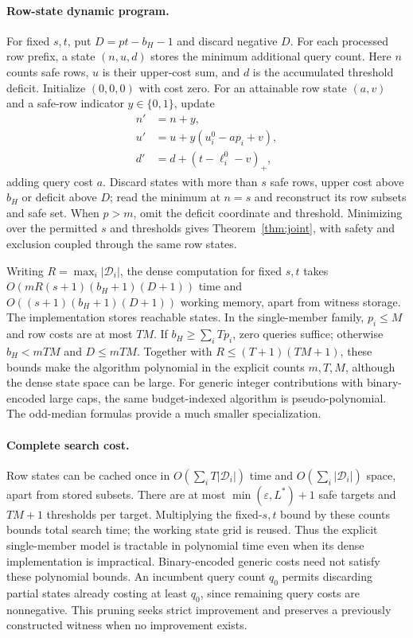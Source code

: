 \paragraph{Row-state dynamic program.}
For fixed $s,t$, put $D=pt-b_H-1$ and discard negative $D$. For each processed row prefix, a state $(n,u,d)$ stores the minimum additional query count. Here $n$ counts safe rows, $u$ is their upper-cost sum, and $d$ is the accumulated threshold deficit. Initialize $(0,0,0)$ with cost zero. For an attainable row state $(a,v)$ and a safe-row indicator $y\in\{0,1\}$, update
\[
 \begin{aligned}
 n'&=n+y,\\
 u'&=u+y(u_i^0-ap_i+v),\\
 d'&=d+(t-\ell_i^0-v)_+,
 \end{aligned}
\]
adding query cost $a$. Discard states with more than $s$ safe rows, upper cost above $b_H$ or deficit above $D$; read the minimum at $n=s$ and reconstruct its row subsets and safe set. When $p>m$, omit the deficit coordinate and threshold. Minimizing over the permitted $s$ and thresholds gives Theorem~\ref{thm:joint}, with safety and exclusion coupled through the same row states.

Writing $R=\max_i|\mathcal D_i|$, the dense computation for fixed $s,t$ takes $O(mR(s+1)(b_H+1)(D+1))$ time and $O((s+1)(b_H+1)(D+1))$ working memory, apart from witness storage. The implementation stores reachable states. In the single-member family, $p_i\le M$ and row costs are at most $TM$. If $b_H\ge\sum_iTp_i$, zero queries suffice; otherwise $b_H<mTM$ and $D\le mTM$. Together with $R\le(T+1)(TM+1)$, these bounds make the algorithm polynomial in the explicit counts $m,T,M$, although the dense state space can be large. For generic integer contributions with binary-encoded large caps, the same budget-indexed algorithm is pseudo-polynomial. The odd-median formulas provide a much smaller specialization.


\paragraph{Complete search cost.}
Row states can be cached once in $O(\sum_i T|\mathcal D_i|)$ time and $O(\sum_i|\mathcal D_i|)$ space, apart from stored subsets. There are at most $\min(\varepsilon,L^*)+1$ safe targets and $TM+1$ thresholds per target. Multiplying the fixed-$s,t$ bound by these counts bounds total search time; the working state grid is reused. Thus the explicit single-member model is tractable in polynomial time even when its dense implementation is impractical. Binary-encoded generic costs need not satisfy these polynomial bounds. An incumbent query count $q_0$ permits discarding partial states already costing at least $q_0$, since remaining query costs are nonnegative. This pruning seeks strict improvement and preserves a previously constructed witness when no improvement exists.

